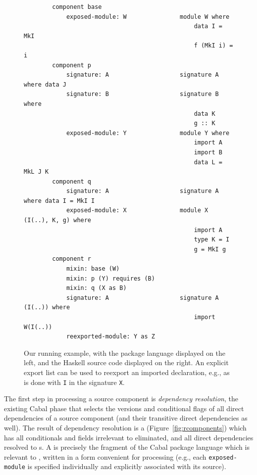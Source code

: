 \begin{figure}
\begin{verbatim}
        component base
            exposed-module: W               module W where
                                                data I = MkI
                                                f (MkI i) = i
        component p
            signature: A                    signature A where data J
            signature: B                    signature B where
                                                data K
                                                g :: K
            exposed-module: Y               module Y where
                                                import A
                                                import B
                                                data L = MkL J K
        component q
            signature: A                    signature A where data I = MkI I
            exposed-module: X               module X (I(..), K, g) where
                                                import A
                                                type K = I
                                                g = MkI g
        component r
            mixin: base (W)
            mixin: p (Y) requires (B)
            mixin: q (X as B)
            signature: A                    signature A (I(..)) where
                                                import W(I(..))
            reexported-module: Y as Z
\end{verbatim}
  \caption{Our running example, with the package language displayed
  on the left, and the Haskell source code displayed on the right.
  An explicit export list can be used to reexport an
  imported declaration, e.g., as is done with \texttt{I} in the
  signature \texttt{X}.}\label{fig:resolved-example}
\end{figure}

The first step in
processing a source component is \emph{dependency resolution},
the existing Cabal phase that
selects the versions and conditional flags of all direct dependencies of
a source component (and their transitive direct dependencies as well).
The result of dependency resolution is a \emph{\ccomp}
(Figure~\ref{fig:rcomponents}) which has all conditionals and fields
irrelevant to \Backpack{} eliminated, and all direct dependencies
resolved to \cid{}s.  A \ccomp{} is precisely the fragment of the
Cabal package language which is relevant to \Backpack{}, written in a
form convenient for processing (e.g., each \verb|exposed-module| is
specified individually and explicitly associated with its source).

